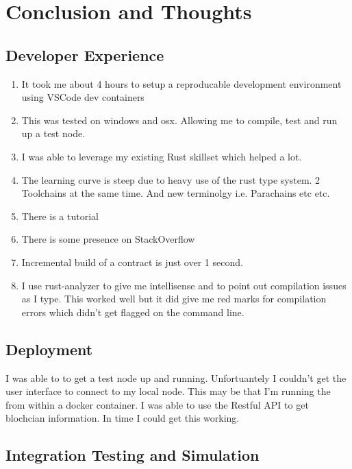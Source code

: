 \chapter{Conclusion and Thoughts}

\section{Developer Experience}

\begin{enumerate}
    \item It took me about 4 hours to setup a reproducable development environment using 
        VSCode dev containers \cite{containers}
    \item This was tested on windows and osx. Allowing me to compile, test and 
        run up a test node. 
    \item I was able to leverage my existing Rust skillset which helped a lot.
    \item The learning curve is steep due to heavy use of the rust type system. 2 Toolchains
        at the same time. And new terminolgy i.e. Parachains etc etc.
    \item There is a tutorial \cite{tutorial}
    \item There is some presence on StackOverflow \cite{overflow}
    \item Incremental build of a contract is just over 1 second.
    \item I use rust-analyzer to give me intellisense and to point out compilation issues as
        I type. This worked well but it did give me red marks for compilation errors
        which didn't get flagged on the command line.
\end{enumerate}

\section{Deployment}

I was able to to get a test node up and running. Unfortuantely I couldn't get the 
user interface to connect to my local node. This may be that I'm running the 
from within a docker container.
I was able to use the Restful API to get blochcian information. In time I could get
this working.

\section{Integration Testing and Simulation}


